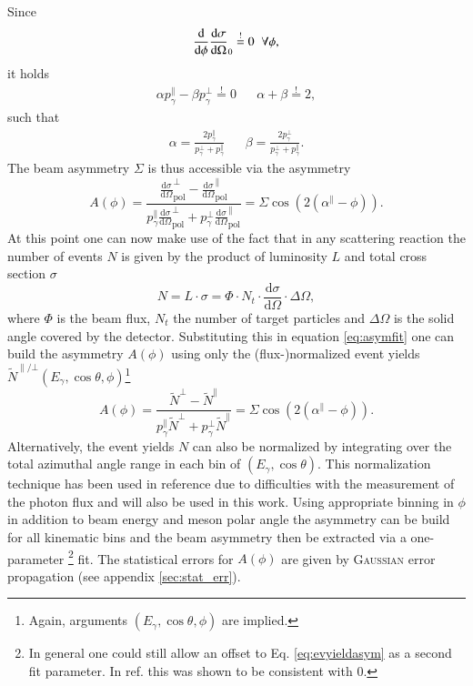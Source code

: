 Since $$\frac{\text{d}}{\text{d}\phi}\frac{\text{d}\sigma}{\text{d}\Omega}_0\overset{!}{=}0\hspace{0.2cm}\forall\phi,$$ it holds \begin{align}
	\alpha p_\gamma^\parallel-\beta p_\gamma^\bot \overset{!}{=}0 && \alpha+\beta\overset{!}{=}2,
\end{align}
such that
\begin{align}
	\alpha =\frac{2p_\gamma^\parallel}{p_\gamma^\bot+p_\gamma^\parallel} && \beta=\frac{2p_\gamma^\bot}{p_\gamma^\bot+p_\gamma^\parallel}.
	\label{eq:alphabeta}
\end{align}
The beam asymmetry $\Sigma$ is thus accessible via the asymmetry \begin{equation}
	A(\phi)=\frac{\frac{\text{d}\sigma}{\text{d}\Omega}_\text{pol}^\bot-\frac{\text{d}\sigma}{\text{d}\Omega}_\text{pol}^\parallel}{p_\gamma^\parallel\frac{\text{d}\sigma}{\text{d}\Omega}_\text{pol}^\bot+p_\gamma^\bot\frac{\text{d}\sigma}{\text{d}\Omega}_\text{pol}^\parallel}=\Sigma\cos\left(2\left(\alpha^\parallel-\phi\right)\right).
	\label{eq:asymfit}
\end{equation}
At this point one can now make use of the fact that in any scattering reaction the number of events $N$ is given by the product of luminosity $L$ and total cross section $\sigma$ \cite{povh} $$N=L\cdot\sigma=\Phi\cdot N_t\cdot\frac{\text{d}\sigma}{\text{d}\Omega}\cdot\Delta\Omega,$$
where $\Phi$ is the beam flux, $N_t$ the number of target particles and $\Delta\Omega$ is the solid angle covered by the detector. Substituting this in equation \eqref{eq:asymfit} one can build the asymmetry $A(\phi)$ using only the (flux-)normalized event yields $\tilde{N}^{\parallel/\bot}\left(E_\gamma,\cos\theta,\phi\right)$\footnote{Again, arguments $\left(E_\gamma,\cos\theta,\phi\right)$ are implied.}
\begin{equation}
	A(\phi)=\frac{\tilde{N}^\bot-\tilde{N}^\parallel}{p_\gamma^\parallel\tilde{N}^\bot+p_\gamma^\bot\tilde{N}^\parallel}=\Sigma\cos\left(2\left(\alpha^\parallel-\phi\right)\right).
	\label{eq:evyieldasym}
\end{equation}
Alternatively, the event yields $N$ can also be normalized by integrating over the total azimuthal angle range in each bin of $(E_\gamma,\cos\theta)$. This normalization technique has been used in reference \cite{farahphd} due to difficulties with the measurement of the photon flux and will also be used in this work. Using appropriate binning in $\phi$ in addition to beam energy and meson polar angle the asymmetry can be build for all kinematic bins and the beam asymmetry then be extracted via a one-parameter \footnote{In general one could still allow an offset to Eq. \ref{eq:evyieldasym} as a second fit parameter. In ref. \cite{farahphd} this was shown to be consistent with $0$.} fit. The statistical errors for $A(\phi)$ are given by \textsc{Gaussian} error propagation (see appendix \ref{sec:stat_err}). 
